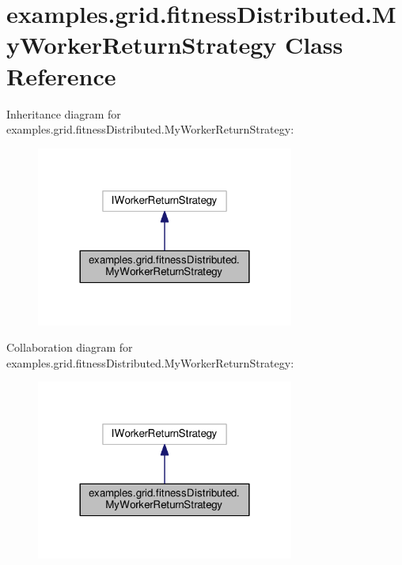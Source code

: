 \hypertarget{classexamples_1_1grid_1_1fitness_distributed_1_1_my_worker_return_strategy}{\section{examples.\-grid.\-fitness\-Distributed.\-My\-Worker\-Return\-Strategy Class Reference}
\label{classexamples_1_1grid_1_1fitness_distributed_1_1_my_worker_return_strategy}
}


Inheritance diagram for examples.\-grid.\-fitness\-Distributed.\-My\-Worker\-Return\-Strategy\-:
\nopagebreak
\begin{figure}[H]
\begin{center}
\leavevmode
\includegraphics[width=240pt]{classexamples_1_1grid_1_1fitness_distributed_1_1_my_worker_return_strategy__inherit__graph}
\end{center}
\end{figure}


Collaboration diagram for examples.\-grid.\-fitness\-Distributed.\-My\-Worker\-Return\-Strategy\-:
\nopagebreak
\begin{figure}[H]
\begin{center}
\leavevmode
\includegraphics[width=240pt]{classexamples_1_1grid_1_1fitness_distributed_1_1_my_worker_return_strategy__coll__graph}
\end{center}
\end{figure}

